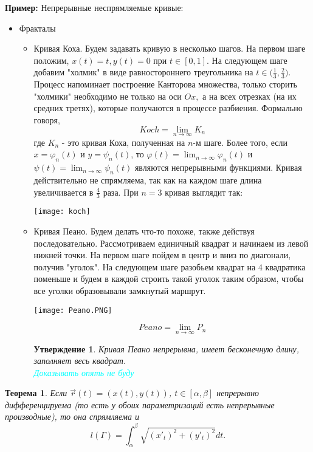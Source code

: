 \documentclass{article}
\theoremstyle{plain}
\newtheorem{theorem}{Теорема}
\newtheorem{claim}{Утверждение}
\theoremstyle{definition}
\theoremstyle{remark}
\renewcommand{\*}{\cdot}
\begin{document}
\textbf{Пример:} Непрерывные неспрямляемые кривые:
\begin{itemize}
    \item Фракталы
    \begin{itemize}
        \item Кривая Коха. Будем задавать кривую в несколько шагов. На первом шаге положим, $x(t) = t, y(t) = 0$ при $t\in[0,1]$. На следующем шаге добавим "холмик" в виде равностороннего треугольника на $t\in \Big(\frac{1}{3}, \frac{2}{3}\Big)$. Процесс напоминает построение Канторова множества, только сторить "холмики" необходимо не только на оси $Ox,$ а на всех отрезках (на их средних третях), которые получаются в процессе разбиения. Формально говоря,
        \[
        Koch = \lim_{n \to \infty}K_n
        \]
        где $K_n$ - это кривая Коха, полученная на $n$-м шаге. Более того, если $x = \varphi_n(t)$ и $y = \psi_n(t)$, то $\varphi(t) = \lim_{n\to \infty} \varphi_n(t)$ и $\psi(t) = \lim_{n\to \infty} \psi_n(t)$ являются непрерывными функциями. Кривая действительно не спрямляема, так как на каждом шаге длина увеличивается в $\frac{4}{3}$ раза.
        При $n = 3$ кривая выглядит так:
        
        \begin{center}
            \texttt{[image: koch]}
        \end{center}
    
        \item Кривая Пеано. Будем делать что-то похоже, также действуя последовательно. Рассмотриваем единичный квадрат и начинаем из левой нижней точки. На первом шаге пойдем в центр и вниз по диагонали, получив "уголок". На следующем шаге разобьем квадрат на 4 квадратика поменьше и будем в каждой строить такой уголок таким образом, чтобы все уголки образовывали замкнутый маршрут.
        \begin{center}
            \texttt{[image: Peano.PNG]}
        \end{center}
  
 $$Peano = \lim_{n\to\infty} P_n$$
    \begin{claim}
    Кривая Пеано непрерывна, имеет бесконечную длину, заполняет весь квадрат.\\
    \textcolor{cyan}{Доказывать опять не буду}
    \end{claim}
    \end{itemize}
\end{itemize}



\begin{theorem}\label{th:spr}
Если $\overrightarrow{r}(t) = (x(t), y(t))$, $t\in [\alpha, \beta]$ непрерывно дифференцируема (то есть у обоих параметризаций есть непрерывные производные), то она спрямляема и
$$l(\Gamma) = \int_{\alpha}^{\beta}\sqrt{(x'_{t})^2 + (y'_{t})^2}dt.$$
\end{theorem}
\end{document}
